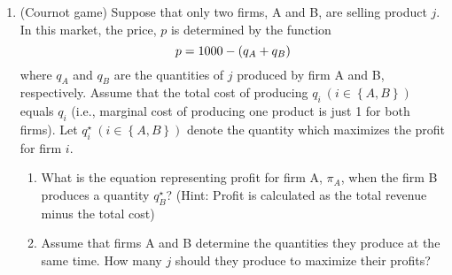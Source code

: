 \documentclass[pdflatex, letterpaper, 12pt]{scrartcl}
\begin{document}
\begin{enumerate}
\item (Cournot game) Suppose that only two firms, A and B, are selling product $j$. In this market, the price, $p$ is determined by the function
\begin{equation}
p = 1000 - (q_A + q_B) \notag 
\end{equation}
where $q_A$ and $q_B$ are the quantities of $j$ produced by firm A and B, respectively. Assume that the total cost of producing $q_i \ (i \in \left\{A, B\right\})$ equals $q_i$ (i.e., marginal cost of producing one product is just 1 for both firms). Let $q^{\star}_i \ (i \in \left\{A, B\right\})$ denote the quantity which maximizes the profit for firm $i$. 
 \begin{enumerate}[label=(\alph*)]
 \item What is the equation representing profit for firm A, $\pi_A$, when the firm B produces a quantity $q^{\star}_B$? (Hint: Profit is calculated as the total revenue minus the total cost)
 \item Assume that firms A and B determine the quantities they produce at the same time. How many $j$ should they produce to maximize their profits?
 \end{enumerate}

 \end{enumerate}
\end{document}
